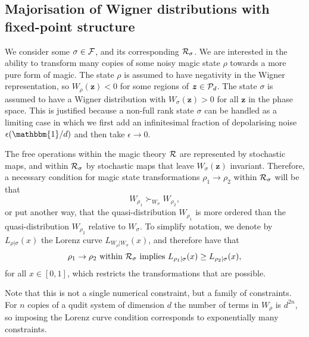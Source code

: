 \documentclass[
onecolumn,
superscriptaddress
]{revtex4-1}
\newcommand{\revhigh}[1]{{\color{red}#1}}
\def\id{\mathbbm{1}}
\def\z{\boldsymbol{z}}
\def\R{{\cal R}}
\def\F{{\cal F}}
\renewcommand{\P}{{\cal P}}
\begin{document}
\subsection*{Majorisation of Wigner distributions with fixed-point structure}

We consider some $\sigma \in \F$, and its corresponding $\R_\sigma$. We are interested in the ability to transform many copies of some noisy magic state $\rho$ towards a more pure form of magic. The state $\rho$ is assumed to have negativity in the Wigner representation, so $W_\rho(\z) < 0$ for some regions of $\z \in \P_d$. The state $\sigma$ is assumed to have a Wigner distribution with $W_\sigma(\z) > 0$ for all $\z$ in the phase space.
\revhigh{This is justified because a non-full rank state $\sigma$ can be handled as a limiting case in which we first add an infinitesimal fraction of depolarising noise $\epsilon (\id/d)$ and then take $\epsilon \rightarrow 0$.}

The free operations within the magic theory $\R$ are represented by stochastic maps, and within $\R_\sigma$ by stochastic maps that leave $W_\sigma(\z)$ invariant. Therefore, a necessary condition for magic state transformations $\rho_1 \rightarrow \rho_2$ within $\R_\sigma$ will be that 
\begin{equation}
	W_{\rho_1} \succ_{W_{\sigma}} W_{\rho_2},
\end{equation}
or put another way, that the quasi-distribution $W_{\rho_1}$ is more ordered than the quasi-distribution $W_{\rho_2}$ relative to $W_\sigma$. To simplify notation, we denote by $L_{\rho | \sigma}(x)$ the Lorenz curve $L_{W_{\rho} | W_{\sigma}} (x)$, and therefore have that
\begin{equation}
\rho_1 \rightarrow \rho_2 \mbox{ within }\R_\sigma \mbox{ implies } L_{\rho_1 |\sigma} (x) \ge L_{\rho_2 |\sigma} (x),
\end{equation}
for all $x \in [0,1]$, which restricts the transformations that are possible.

Note that this is not a single numerical constraint, but a family of constraints. For $n$ copies of a qudit system of dimension $d$ the number of terms in $W_{\rho}$ is $d^{2n}$, so imposing the Lorenz curve condition corresponds to exponentially many constraints. 

\end{document}
